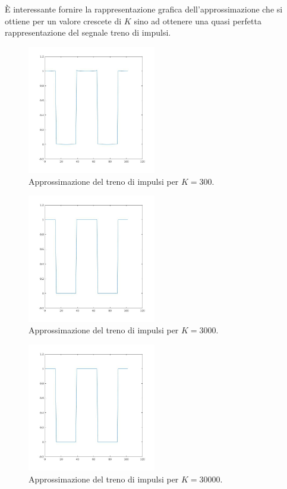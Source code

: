 \documentclass[12pt,oneside,openany]{memoir}
\numberwithin{equation}{subsection}
\begin{document}
\`E interessante fornire la rappresentazione grafica dell'approssimazione che si ottiene per un valore crescete di $K$ sino ad ottenere una quasi perfetta rappresentazione del segnale treno di impulsi.
\begin{figure}[H]
\centering
\captionsetup{justification=centering}
\includegraphics[width=0.5\textwidth]{images/matlab_approssimazione_5.jpg}
\caption{Approssimazione del treno di impulsi per $K = 300$.}
\end{figure}
\begin{figure}[H]
\centering
\captionsetup{justification=centering}
\includegraphics[width=0.5\textwidth]{images/matlab_approssimazione_6.jpg}
\caption{Approssimazione del treno di impulsi per $K = 3000$.}
\end{figure}
\begin{figure}[H]
\centering
\captionsetup{justification=centering}
\includegraphics[width=0.5\textwidth]{images/matlab_approssimazione_7.jpg}
\caption{Approssimazione del treno di impulsi per $K = 30000$.}
\end{figure}
\end{document}
